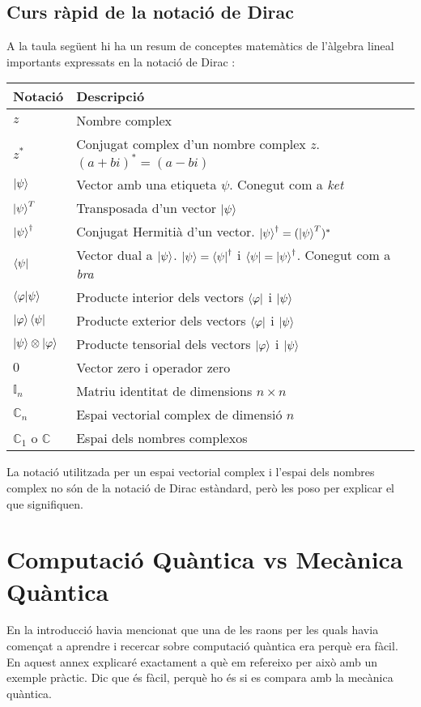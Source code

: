\section{Curs ràpid de la notació de Dirac}
A la taula següent hi ha un resum de conceptes matemàtics de l'àlgebra lineal importants expressats en la notació de Dirac \cite{QCandQI:dirac_notation}:
\begin{tabular}{ p{2cm}|p{12cm} }
	\hline
	Notació & Descripció\\
	\hline
	\hline
	$z$ & Nombre complex \\
	$z^{*}$ & Conjugat complex d'un nombre complex $z$. $(a+ bi)^{*} = (a -bi)$\\
	$\ket{\psi} $ & Vector amb una etiqueta $\psi$. Conegut com a \textit{ket}\\
	$\ket{\psi}^T$ & Transposada d'un vector $\ket{\psi}$ \\
	$\ket{\psi}^\dag $ & Conjugat Hermitià d'un vector. $\ket{\psi}^\dag = (\ket{\psi}^T)^* $\\
	$\bra{\psi} $ & Vector dual a $\ket{\psi}$. $ \ket{\psi} = \bra{\psi}^{\dag}$ i $\bra{\psi} = \ket{\psi}^\dag$. Conegut com a \textit{bra}\\
	$ \bra{\varphi}\ket{\psi} $ & Producte interior dels vectors $\bra{\varphi}$ i $\ket{\psi}$ \\
	$ \ket{\varphi}\bra{\psi} $ & Producte exterior dels vectors $\bra{\varphi}$ i $\ket{\psi}$ \\
	$ \ket{\psi}\otimes\ket{\varphi}$ & Producte tensorial dels vectors $\ket{\varphi}$ i $\ket{\psi}$ \\
	$ 0 $ & Vector zero i operador zero \\
	$ \mathbb{I}_n $ & Matriu identitat de dimensions $n\times n$ \\
	$ \mathbb{C}_n $ & Espai vectorial complex de dimensió $n$ \\
	$ \mathbb{C}_1$ o $\mathbb{C} $ & Espai dels nombres complexos \\
	
\end{tabular}
La notació utilitzada per un espai vectorial complex i l'espai dels nombres complex no són de la notació de Dirac estàndard, però les poso per explicar el que signifiquen.

\chapter{Computació Quàntica vs Mecànica Quàntica}
En la introducció havia mencionat que una de les raons per les quals havia començat a aprendre i recercar sobre computació quàntica era perquè era fàcil. En aquest annex explicaré exactament a què em refereixo per això amb un exemple pràctic. Dic que és fàcil, perquè ho és si es compara amb la mecànica quàntica.

